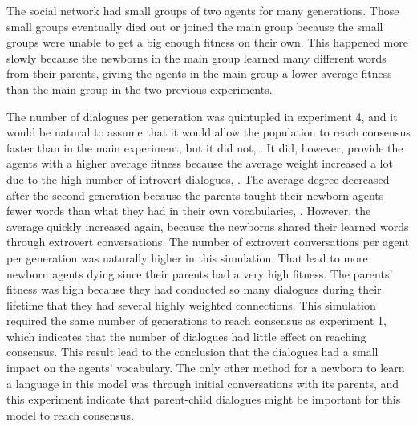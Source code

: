 The social network had small groups of two agents for many generations. Those small groups eventually died out or joined the main group because the small groups were unable to get a big enough fitness on their own. This happened more slowly because the newborns in the main group learned many different words from their parents, giving the agents in the main group a lower average fitness than the main group in the two previous experiments.

The number of dialogues per generation was quintupled in experiment 4, and it would be natural to assume that it would allow the population to reach consensus faster than in the main experiment, but it did not, . It did, however, provide the agents with a higher average fitness because the average weight increased a lot due to the high number of introvert dialogues, . The average degree decreased after the second generation because the parents taught their newborn agents fewer words than what they had in their own vocabularies, . However, the average quickly increased again, because the newborns shared their learned words through extrovert conversations. The number of extrovert conversations per agent per generation was naturally higher in this simulation. That lead to more newborn agents dying since their parents had a very high fitness. The parents' fitness was high because they had conducted so many dialogues during their lifetime that they had several highly weighted connections. This simulation required the same number of generations to reach consensus as experiment 1, which indicates that the number of dialogues had little effect on reaching consensus. This result lead to the conclusion that the dialogues had a small impact on the agents' vocabulary. The only other method for a newborn to learn a language in this model was through initial conversations with its parents, and this experiment indicate that parent-child dialogues might be important for this model to reach consensus.  


